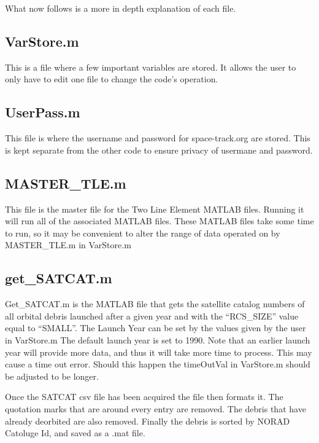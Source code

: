 \documentclass[12pt]{report}
\begin{document}
	What now follows is a more in depth explanation of each file. 
		\subsection{VarStore.m}
		This is a file where a few important variables are stored. It allows the user to only have to edit one file to change the code's operation.
		\subsection{UserPass.m}
		This file is where the username and password for space-track.org are stored. This is kept separate from the other code to ensure privacy of usermane and password. 
		\subsection{MASTER\_TLE.m}
		This file is the master file for the Two Line Element MATLAB files. Running it will run all of the associated MATLAB files. These MATLAB files take some time to run, so it may be convenient to alter the range of data operated on by MASTER\_TLE.m in VarStore.m
		\subsection{get\_SATCAT.m}
		Get\_SATCAT.m is the MATLAB file that gets the satellite catalog  numbers of all orbital debris launched after a given year and with the “RCS\_SIZE” value equal to “SMALL”. The Launch Year can be set by the values given by the user in VarStore.m The default launch year is set to 1990. Note that an earlier launch year will provide more data, and thus it will take more time to process. This may cause a time out error. Should this happen the timeOutVal in VarStore.m should be adjusted to be longer.\par 
		Once the SATCAT csv file has been acquired the file then formats it. The quotation marks that are around every entry are removed. The debris that have already deorbited are also removed. Finally the debris is sorted by NORAD Catoluge Id, and saved as a .mat file.
\end{document}

